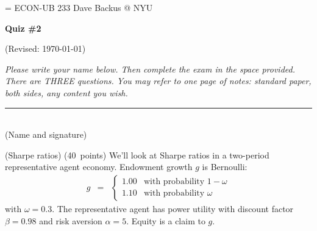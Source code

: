 \documentclass[11pt]{exam}
\begin{document}
\parskip=\bigskipamount
\parindent=0.0in
\thispagestyle{empty}
{\large ECON-UB 233 \hfill Dave Backus @ NYU}

\bigskip\bigskip
\centerline{\Large \bf Quiz \#2}
\centerline{(Revised: \today)}

\bigskip
{\it Please write your name below.
Then complete the exam in the space provided.
There are THREE questions.
You may refer to one page of notes:
standard paper, both sides, any content you wish.}

\bigskip
\begin{flushleft}
\rule{4in}{0.5pt} \\ (Name and signature)
\end{flushleft}


\begin{questions}
\question (Sharpe ratios) (40~points)
We'll look at Sharpe ratios in a two-period representative agent economy.
Endowment growth $g$ is Bernoulli:
\begin{eqnarray*}
    g &=&
        \left\{
        \begin{array}{ll}
            1.00    &  \mbox{with probability } 1-\omega \\
            1.10    &  \mbox{with probability } \omega
        \end{array}
        \right.
\end{eqnarray*}
with $\omega = 0.3$.
The representative agent has power utility with discount factor $\beta = 0.98$
and risk aversion $\alpha = 5$.
Equity is a claim to $g$.



\end{questions}
\end{document}
